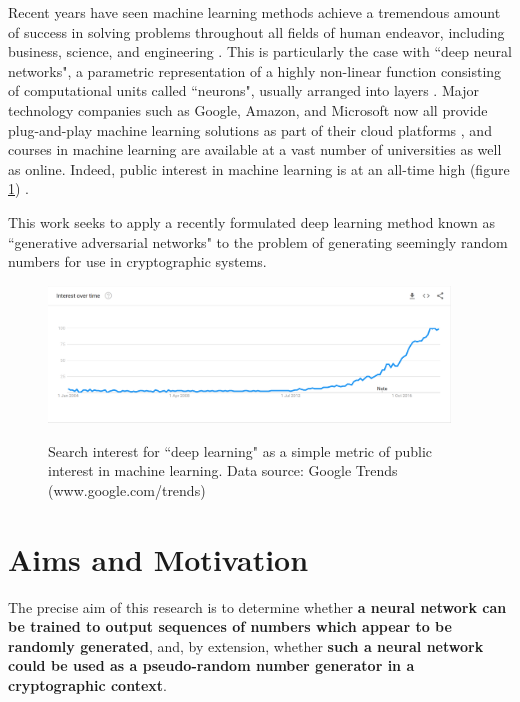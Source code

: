 \documentclass[12pt, titlepage]{report}
\theoremstyle{definition}
\begin{document}
Recent years have seen machine learning methods achieve a tremendous amount of success in solving problems throughout all fields of human endeavor, including business, science, and engineering \cite[p. 24-29]{russel2009artificial}. This is particularly the case with ``deep neural networks", a parametric representation of a highly non-linear function consisting of computational units called ``neurons", usually arranged into layers \cite[p. 731-732]{russel2009artificial}. Major technology companies such as Google, Amazon, and Microsoft now all provide plug-and-play machine learning solutions as part of their cloud platforms \cite{google2018automl} \cite{amazon2018aws} \cite{microsoft2018azure}, and courses in machine learning are available at a vast number of universities as well as online. Indeed, public interest in machine learning is at an all-time high (figure \ref{figure:googletrends_dl}) \cite{forbes2016short}.

This work seeks to apply a recently formulated deep learning method known as ``generative adversarial networks" to the problem of generating seemingly random numbers for use in cryptographic systems.


\begin{figure}
\centering
\includegraphics[width=0.95\textwidth]{img/google_trends_dl.png}\\
\caption{Search interest for ``deep learning" as a simple metric of public interest in machine learning. Data source: Google Trends (www.google.com/trends) \cite{google2018trends}}
\label{figure:googletrends_dl}
\end{figure}


\section{Aims and Motivation}\label{subsection:aims}
The precise aim of this research is to determine whether \textbf{a neural network can be trained to output sequences of numbers which appear to be randomly generated}, and, by extension, whether \textbf{such a neural network could be used as a pseudo-random number generator in a cryptographic context}. 
\end{document}
